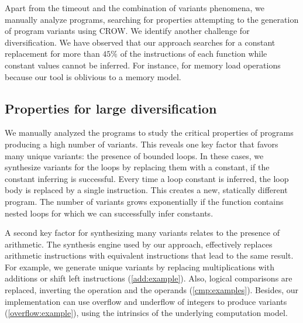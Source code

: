 Apart from the timeout and the combination of variants phenomena, we manually analyze programs, searching for properties attempting to the generation of program variants using CROW.
We identify another challenge for diversification.
We have observed that our approach searches for a constant replacement for more than $45\%$ of the instructions of each function while constant values cannot be inferred. For instance,  for memory load operations because our tool is oblivious to a memory model. 




\subsection*{Properties for large diversification}

We manually analyzed the programs to study the critical properties of programs producing a high number of variants.
This reveals one key factor that favors many unique variants: the presence of bounded loops. In these cases, we synthesize variants for the loops by replacing them with a constant, if the constant inferring is successful. Every time a loop constant is inferred, the loop body is replaced by a single instruction. This creates a new, statically different program. The number of variants grows exponentially if the function contains nested loops for which we can successfully infer constants. 
 

A second key factor for synthesizing many variants relates to the presence of arithmetic. The synthesis engine used by our approach, effectively replaces arithmetic instructions with equivalent instructions that lead to the same result. For example, we generate unique variants by replacing multiplications with additions or shift left instructions (\autoref{add:example}). Also, logical comparisons are replaced, inverting the operation and the operands (\autoref{cmp:examples}). Besides, our implementation can use overflow and underflow of integers to produce variants (\autoref{overflow:example}), using the intrinsics of the underlying computation model.

